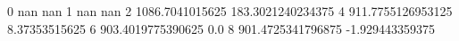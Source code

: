 0 nan nan
1 nan nan
2 1086.7041015625 183.3021240234375
4 911.7755126953125 8.37353515625
6 903.4019775390625 0.0
8 901.4725341796875 -1.929443359375
